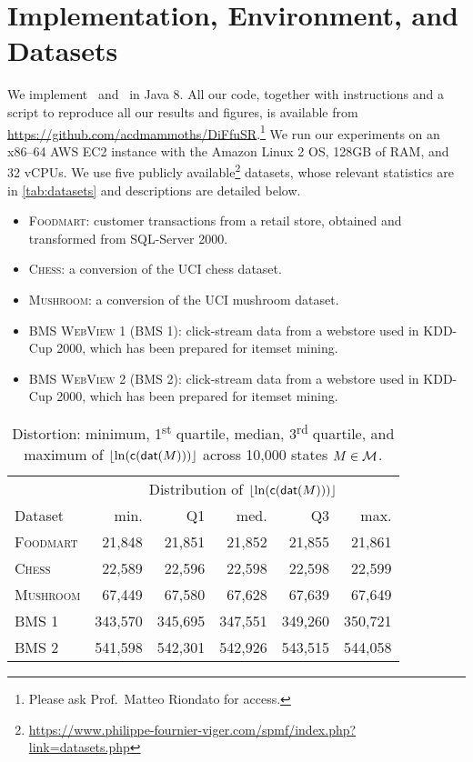 \section{Implementation, Environment, and Datasets}

We implement \algo\ and \gioalgo\ in Java 8. All our code, together with
instructions and a script to reproduce all our results and figures, is available
from \url{https://github.com/acdmammoths/DiFfuSR}.\footnote{Please ask Prof.\
Matteo Riondato for access.} We run our experiments on an x86--64 AWS EC2
instance with the Amazon Linux 2 OS, 128GB of RAM, and 32 vCPUs. We use five
publicly
available\footnote{\url{https://www.philippe-fournier-viger.com/spmf/index.php?link=datasets.php}}
datasets, whose relevant statistics are in \cref{tab:datasets} and descriptions
are detailed below.
\begin{itemize}
  \item \textsc{Foodmart}: customer transactions from a retail store, obtained
    and transformed from SQL-Server 2000.
  \item \textsc{Chess}: a conversion of the UCI chess dataset.
  \item \textsc{Mushroom}: a conversion of the UCI mushroom dataset.
  \item \textsc{BMS WebView 1 (BMS 1)}: click-stream data from a webstore used
    in KDD-Cup 2000, which has been prepared for itemset mining.
  \item \textsc{BMS WebView 2 (BMS 2)}: click-stream data from a webstore used
    in KDD-Cup 2000, which has been prepared for itemset mining.
\end{itemize}

\begin{table}[htb]
  \caption{Distortion: minimum, 1\textsuperscript{st} quartile, median,
    3\textsuperscript{rd} quartile, and maximum of
    $\lfloor\ln(\mathsf{c}\lparen\mathsf{dat}\lparen M\rparen\rparen)\rfloor$ across 10,000 states $M \in
\mathcal{M}$.}\label{tab:distortion}
  \centering
  \begin{tabular}{lrrrrr}
    & \multicolumn{5}{c}{Distribution of $\lfloor \ln(\mathsf{c}\lparen\mathsf{dat}\lparen M\rparen\rparen)
    \rfloor$} \\
    \cmidrule(lr){2-6}
    Dataset & min. & Q1 & med. & Q3 & max. \\
    \midrule
    \textsc{Foodmart} & 21,848 & 21,851 & 21,852 & 21,855 & 21,861 \\
    \textsc{Chess} & 22,589 & 22,596 & 22,598 & 22,598 & 22,599 \\
    \textsc{Mushroom} & 67,449 & 67,580 & 67,628 & 67,639 & 67,649 \\
    \textsc{BMS 1} & 343,570 & 345,695 & 347,551 & 349,260 & 350,721 \\
    \textsc{BMS 2} & 541,598 & 542,301 & 542,926 & 543,515 & 544,058
  \end{tabular}
\end{table}

